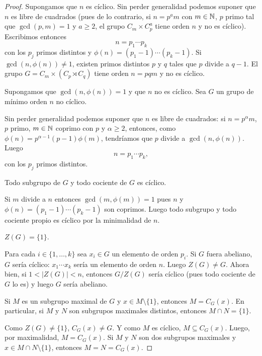 \begin{proof}
	Supongamos que $n$ es cíclico.  Sin perder generalidad podemos suponer que
	$n$ es libre de cuadrados (pues de lo contrario, si $n=p^am$ con $m\in\mathbb{N}$,
	$p$ primo tal que $\gcd(p,m)=1$ y $a\geq2$, el grupo $C_m\times C_p^a$ tiene
	orden $n$ y no es cíclico).  Escribimos entonces 
	\[
	n=p_1\cdots p_k
	\]
	con los
	$p_j$ primos distintos y $\phi(n)=(p_1-1)\cdots(p_k-1)$. Si
	$\gcd(n,\phi(n))\ne1$, existen primos distintos $p$ y $q$ tales que $p$ divide
	a $q-1$. El grupo $G= C_m\times (C_p\rtimes C_q)$ tiene orden $n=pqm$ y no
	es cíclico.  

	Supongamos que $\gcd(n,\phi(n))=1$ y que $n$ no es cíclico. Sea $G$ un grupo de
	mínimo orden $n$ no cíclico. 

	Sin perder generalidad podemos suponer que $n$ es libre de cuadrados:
	si $n=p^\alpha m$, $p$ primo, $m\in\mathbb{N}$ coprimo con $p$ y $\alpha\geq2$,
	entonces, como $\phi(n)=p^{\alpha-1}(p-1)\phi(m)$, tendríamos que $p$
	divide a $\gcd(n,\phi(n))$. Luego
	\[
		n=p_1\cdots p_k,
	\]
	con los $p_j$ primos distintos.

	\begin{claim}
	  Todo subgrupo de $G$ y todo cociente de $G$ es cíclico.
	\end{claim}

	Si $m$ divide a $n$ entonces $\gcd(m,\phi(m))=1$ pues $n$ y
	$\phi(n)=(p_1-1)\cdots(p_k-1)$ son coprimos.  Luego todo subgrupo y
	todo cociente propio es cíclico por la minimalidad de $n$.

	\begin{claim}
	  $Z(G)=\{1\}$.
	\end{claim}

	Para cada $i\in\{1,\dots,k\}$ sea $x_i\in G$ un elemento de orden
	$p_i$. Si $G$ fuera abeliano, $G$ sería cíclico: $x_1\cdots x_k$ sería
	un elemento de orden $n$. Luego $Z(G)\ne G$.  Ahora bien, si
	$1<|Z(G)|<n$, entonces $G/Z(G)$ sería cíclico (pues todo cociente de $G$
	lo es) y luego $G$ sería abeliano. 

	\begin{claim}
	  Si $M$ es un subgrupo maximal de $G$ y $x\in M\setminus\{1\}$, entonces 
	  $M=C_G(x)$. En particular, si $M$ y $N$ son subgrupos
	  maximales distintos, entonces $M\cap N=\{1\}$. 
	\end{claim}

	Como $Z(G)\ne\{1\}$, $C_G(x)\ne G$. Y como $M$ es cíclico,
	$M\subseteq C_G(x)$. Luego, por maximalidad, $M=C_G(x)$. 
	Si $M$ y $N$ son dos subgrupos maximales y $x\in M\cap
	N\setminus\{1\}$, entonces $M=N=C_G(x)$. 


\end{proof}
